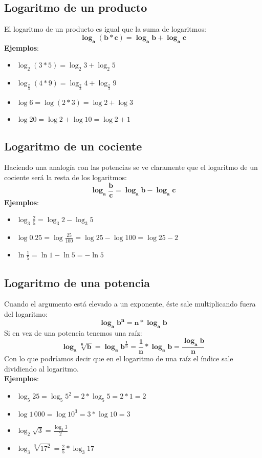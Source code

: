 \documentclass[a4paper,10pt,answers]{exam}
\begin{document}
\subsection{Logaritmo de un producto}
El logaritmo de un producto es igual que la suma de logaritmos:
\large
\[\boldsymbol{\log_a (b*c) = \log_a b + \log_a c}\]
\normalsize
\textbf{Ejemplos}: 
\begin{itemize}
	\item $\log_2 (3*5) = \log_2 3 + \log_2 5$
	\item $\log_\frac{2}{3} (4*9) = \log_\frac{2}{3} 4 + \log_\frac{2}{3} 9$
	\item $\log 6 = \log (2*3) = \log 2 + \log 3$
	\item $\log 20 = \log 2 + \log 10 = \log 2 + 1$
\end{itemize}

\subsection{Logaritmo de un cociente}
Haciendo una analogía con las potencias se ve claramente que el logaritmo de un cociente será la resta de los logaritmos:
\large
\[\boldsymbol{\log_a \frac{b}{c} = \log_a b - \log_a c}\]
\normalsize
\textbf{Ejemplos}:
\begin{itemize}
	\item $\log_3 \frac{2}{5} = \log_3 2 - \log_3 5$
	\item $\log 0.25 = \log \frac{25}{100} = \log 25 - \log 100 = \log 25 - 2$
	\item $\ln \frac{1}{5} = \ln 1 - \ln 5 = -\ln 5$
\end{itemize}

\subsection{Logaritmo de una potencia}
Cuando el argumento está elevado a un exponente, éste sale multiplicando fuera del logaritmo:
\large
\[\boldsymbol{\log_a b^n = n*\log_a b}\]
\normalsize
Si en vez de una potencia tenemos una raíz:
\[\boldsymbol{\log_a \sqrt[n]{b} = \log_a b^{\frac{1}{n}} = \frac{1}{n}*\log_a b = \frac{\log_a b}{n}}\]
Con lo que podríamos decir que en el logaritmo de una raíz el índice sale dividiendo al logaritmo.\\

\textbf{Ejemplos}:
\begin{itemize}
	\item $\log_5 25 = \log_5 5^2 = 2* \log_5 5 = 2*1 = 2$
	\item $\log 1\,000 = \log 10^3 = 3* \log 10 = 3$
	\item $\log_2 \sqrt{3} = \frac{\log_2 3}{2}$
	\item $\log_3 \sqrt[5]{17^2} = \frac{2}{5} * \log_3 17$
\end{itemize}
\end{document}
